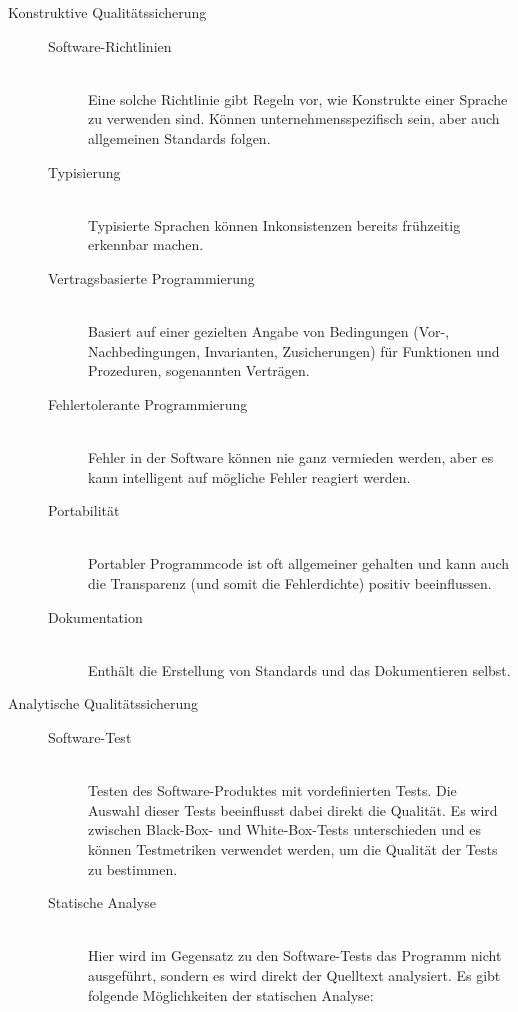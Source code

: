 \begin{description}
  \item[Konstruktive Qualitätssicherung] \hfill
  \begin{description}
    \item[Software-Richtlinien] \hfill \\ Eine solche Richtlinie gibt Regeln vor, wie Konstrukte einer Sprache zu verwenden sind. Können unternehmensspezifisch sein, aber auch allgemeinen Standards folgen.
    \item[Typisierung] \hfill \\ Typisierte Sprachen können Inkonsistenzen bereits frühzeitig erkennbar machen.
    \item[Vertragsbasierte Programmierung] \hfill \\ Basiert auf einer gezielten Angabe von Bedingungen (Vor-, Nachbedingungen, Invarianten, Zusicherungen) für Funktionen und Prozeduren, sogenannten Verträgen.
    \item[Fehlertolerante Programmierung] \hfill \\ Fehler in der Software können nie ganz vermieden werden, aber es kann intelligent auf mögliche Fehler reagiert werden.
    \item[Portabilität] \hfill \\ Portabler Programmcode ist oft allgemeiner gehalten und kann auch die Transparenz (und somit die Fehlerdichte) positiv beeinflussen.
    \item[Dokumentation] \hfill \\ Enthält die Erstellung von Standards und das Dokumentieren selbst.
  \end{description}
  \item[Analytische Qualitätssicherung] \hfill
  \begin{description}
    \item[Software-Test] \hfill \\ Testen des Software-Produktes mit vordefinierten Tests. Die Auswahl dieser Tests beeinflusst dabei direkt die Qualität. Es wird zwischen Black-Box- und White-Box-Tests unterschieden und es können Testmetriken verwendet werden, um die Qualität der Tests zu bestimmen.
    \item[Statische Analyse] \hfill \\ Hier wird im Gegensatz zu den Software-Tests das Programm nicht ausgeführt, sondern es wird direkt der Quelltext analysiert. Es gibt folgende Möglichkeiten der statischen Analyse:
    \begin{description}

\end{description}
\end{description}
\end{description}
